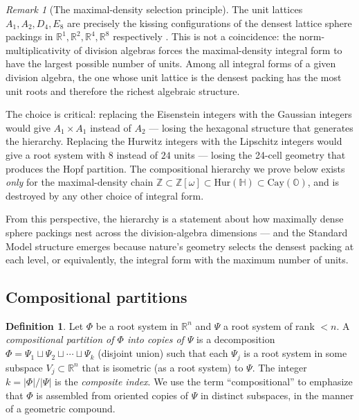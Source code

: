 \documentclass[11pt,reqno]{amsart}
\theoremstyle{plain}
\theoremstyle{definition}
\newtheorem{definition}[theorem]{Definition}
\theoremstyle{remark}
\newtheorem{remark}[theorem]{Remark}
\newcommand{\R}{\mathbb{R}}
\newcommand{\Z}{\mathbb{Z}}
\newcommand{\HH}{\mathbb{H}}
\newcommand{\OO}{\mathbb{O}}
\newcommand{\Hur}{\mathrm{Hur}}
\newcommand{\Cay}{\mathrm{Cay}}
\begin{document}
\begin{remark}[The maximal-density selection principle]
\label{rem:packing}
The unit lattices $A_1, A_2, D_4, E_8$ are precisely the
kissing configurations of the densest lattice sphere packings
in $\R^1, \R^2, \R^4, \R^8$ respectively
\cite{ConwaySloane1999,Viazovska2017}.
This is not a coincidence: the norm-multiplicativity of
division algebras forces the maximal-density integral form
to have the largest possible number of units.
Among all integral forms of a given division algebra,
the one whose unit lattice is the densest packing has the
most unit roots and therefore the richest algebraic
structure.

The choice is critical: replacing the Eisenstein integers
with the Gaussian integers would give $A_1 \times A_1$
instead of $A_2$ --- losing the hexagonal structure that
generates the hierarchy.
Replacing the Hurwitz integers with the Lipschitz integers
would give a root system with $8$ instead of $24$ units ---
losing the 24-cell geometry that produces the Hopf partition.
The compositional hierarchy we prove below exists
\emph{only} for the maximal-density chain
$\Z \subset \Z[\omega] \subset \Hur(\HH) \subset \Cay(\OO)$,
and is destroyed by any other choice of integral form.

From this perspective, the hierarchy is a statement about how
maximally dense sphere packings nest across the
division-algebra dimensions --- and the Standard Model
structure emerges because nature's geometry selects the
densest packing at each level, or equivalently,
the integral form with the maximum number of units.
\end{remark}

\subsection{Compositional partitions}

\begin{definition}\label{def:compositional}
Let $\Phi$ be a root system in $\R^n$ and $\Psi$ a root system
of rank $< n$.
A \emph{compositional partition of $\Phi$ into copies of $\Psi$}
is a decomposition
$\Phi = \Psi_1 \sqcup \Psi_2 \sqcup \cdots \sqcup \Psi_k$
(disjoint union)
such that each $\Psi_j$ is a root system in some subspace
$V_j \subset \R^n$ that is isometric (as a root system) to $\Psi$.
The integer $k = |\Phi|/|\Psi|$ is the \emph{composite index}.
We use the term ``compositional'' to emphasize that
$\Phi$ is assembled from oriented copies of $\Psi$
in distinct subspaces, in the manner of a geometric compound.
\end{definition}
\end{document}
